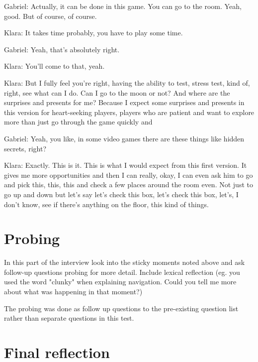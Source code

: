 \begin{QandA}
\begin{answered}
            Gabriel: Actually, it can be done in this game.
            You can go to the room.
            Yeah, good.
            But of course, of course.


            Klara: It takes time probably, you have to play some time.


            Gabriel: Yeah, that's absolutely right.


            Klara: You'll come to that, yeah.


            Klara: But I fully feel you're right, having the ability to test, stress test, kind of, right, see what can I do.
            Can I go to the moon or not?
            And where are the surprises and presents for me?
            Because I expect some surprises and presents in this version for heart-seeking players, players who are patient and want to explore more than just go through the game quickly and


            Gabriel: Yeah, you like, in some video games there are these things like hidden secrets, right?


            Klara: Exactly.
            This is it.
            This is what I would expect from this first version.
            It gives me more opportunities and then I can really, okay, I can even ask him to go and pick this, this, this and check a few places around the room even.
            Not just to go up and down but let's say let's check this box, let's check this box, let's, I don't know,
            see if there's anything on the floor, this kind of things.
            

            
         \end{answered}
\end{QandA}






\section{Probing}
In this part of the interview look into the sticky moments noted above and ask follow-up questions probing for more detail.
Include lexical reflection (eg. you used the word "clunky" when explaining navigation. Could you tell me more about what was happening
in that moment?)

The probing was done as follow up questions to the pre-existing question list rather than separate questions in this test.


\section{Final reflection}

